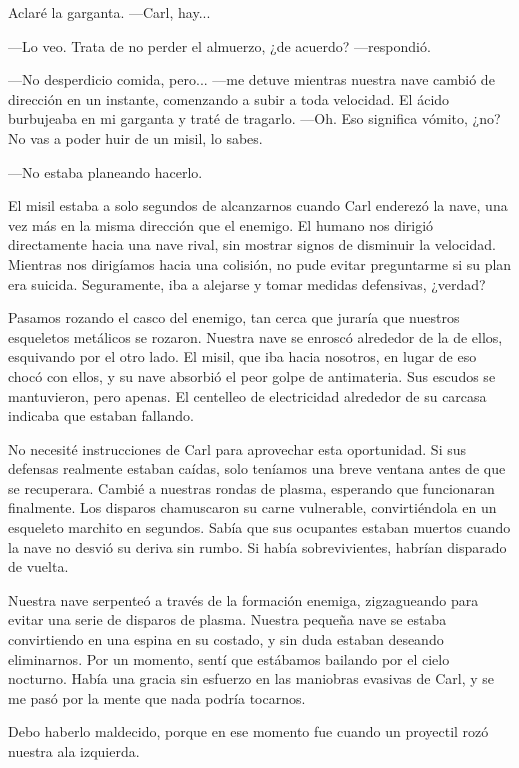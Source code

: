 \documentclass[spanish,12pt,a4paper,oneside,titlepage]{book}
\begin{document}
    Aclaré la garganta. —Carl, hay...

    —Lo veo. Trata de no perder el almuerzo, ¿de acuerdo? —respondió.

    —No desperdicio comida, pero... —me detuve mientras nuestra nave cambió de dirección en un instante, comenzando a subir a toda velocidad. El ácido burbujeaba en mi garganta y traté de tragarlo. —Oh. Eso significa vómito, ¿no? No vas a poder huir de un misil, lo sabes.

    —No estaba planeando hacerlo.

    El misil estaba a solo segundos de alcanzarnos cuando Carl enderezó la nave, una vez más en la misma dirección que el enemigo. El humano nos dirigió directamente hacia una nave rival, sin mostrar signos de disminuir la velocidad. Mientras nos dirigíamos hacia una colisión, no pude evitar preguntarme si su plan era suicida. Seguramente, iba a alejarse y tomar medidas defensivas, ¿verdad?

    Pasamos rozando el casco del enemigo, tan cerca que juraría que nuestros esqueletos metálicos se rozaron. Nuestra nave se enroscó alrededor de la de ellos, esquivando por el otro lado. El misil, que iba hacia nosotros, en lugar de eso chocó con ellos, y su nave absorbió el peor golpe de antimateria. Sus escudos se mantuvieron, pero apenas. El centelleo de electricidad alrededor de su carcasa indicaba que estaban fallando.

    No necesité instrucciones de Carl para aprovechar esta oportunidad. Si sus defensas realmente estaban caídas, solo teníamos una breve ventana antes de que se recuperara. Cambié a nuestras rondas de plasma, esperando que funcionaran finalmente. Los disparos chamuscaron su carne vulnerable, convirtiéndola en un esqueleto marchito en segundos. Sabía que sus ocupantes estaban muertos cuando la nave no desvió su deriva sin rumbo. Si había sobrevivientes, habrían disparado de vuelta.

    Nuestra nave serpenteó a través de la formación enemiga, zigzagueando para evitar una serie de disparos de plasma. Nuestra pequeña nave se estaba convirtiendo en una espina en su costado, y sin duda estaban deseando eliminarnos. Por un momento, sentí que estábamos bailando por el cielo nocturno. Había una gracia sin esfuerzo en las maniobras evasivas de Carl, y se me pasó por la mente que nada podría tocarnos.

    Debo haberlo maldecido, porque en ese momento fue cuando un proyectil rozó nuestra ala izquierda.
\end{document}
